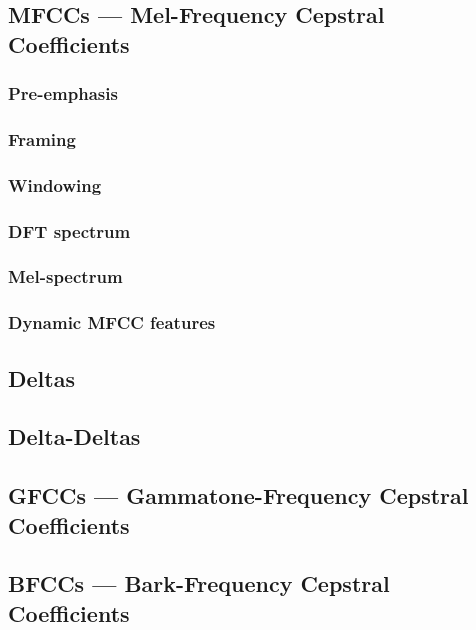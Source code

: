\subsection{MFCCs --- Mel-Frequency Cepstral Coefficients}

\subsubsection{Pre-emphasis}
\subsubsection{Framing}
\subsubsection{Windowing}
\subsubsection{DFT spectrum}
\subsubsection{Mel-spectrum}
\subsubsection{Dynamic MFCC features}


\subsection{Deltas}
\subsection{Delta-Deltas}

\subsection{GFCCs --- Gammatone-Frequency Cepstral Coefficients}
\subsection{BFCCs --- Bark-Frequency Cepstral Coefficients}
